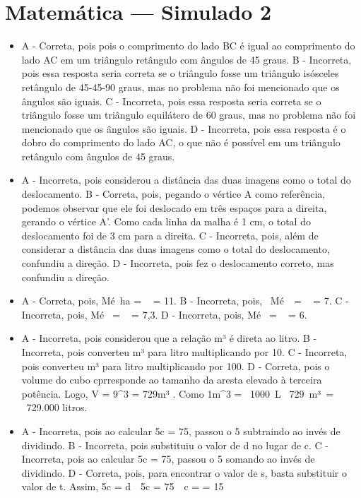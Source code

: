 \section*{Matemática — Simulado 2}
\begin{itemize}
\item A - Correta, pois pois o comprimento do lado BC é igual ao comprimento
do lado AC em um triângulo retângulo com ângulos de 45 graus.
B - Incorreta, pois essa resposta seria correta se o triângulo fosse um
triângulo isósceles retângulo de 45-45-90 graus, mas no problema não foi
mencionado que os ângulos são iguais.
C - Incorreta, pois essa resposta seria correta se o triângulo fosse um
triângulo equilátero de 60 graus, mas no problema não foi mencionado que
os ângulos são iguais.
D - Incorreta, pois essa resposta é o dobro do comprimento do lado AC, o
que não é possível em um triângulo retângulo com ângulos de 45 graus.
\item A - Incorreta, pois considerou a distância das duas imagens como o total
do deslocamento.
B - Correta, pois, pegando o vértice A como referência, podemos observar
que ele foi deslocado em três espaços para a direita, gerando o vértice
A'. Como cada linha da malha é 1 cm, o total do deslocamento foi de 3 cm
para a direita.
C - Incorreta, pois, além de considerar a distância das duas imagens
como o total do deslocamento, confundiu a direção.
D - Incorreta, pois fez o deslocamento correto, mas confundiu a direção.
\item A - Correta, pois,
Mé\ ha = \  = 11.
B - Incorreta, pois,
\ Mé\ \  = \  = 7.
C - Incorreta, pois,
Mé\  = \  = 7,3.
D - Incorreta, pois,
Mé\  = \  = 6.
\item A - Incorreta, pois considerou que a relação m³ é direta ao litro.
B - Incorreta, pois converteu m³ para litro multiplicando por 10.
C - Incorreta, pois converteu m³ para litro multiplicando por 100.
D - Correta, pois o volume do cubo cprresponde ao tamanho da aresta
elevado à terceira potência. Logo, V = 9^{3} = 729m³ . Como
1m^{3} = \ 1000\ L \rightarrow \ 729\ m³\  = \ 729.000 litros.
\item A - Incorreta, pois ao calcular 5c = 75, passou o 5 subtraindo ao
invés de dividindo.
B - Incorreta, pois substituiu o valor de d no lugar de c.
C - Incorreta, pois ao calcular 5c = 75, passou o 5 somando ao invés
de dividindo.
D - Correta, pois, para encontrar o valor de s, basta substituir o valor
de t. Assim, 5c = d\  \rightarrow \ 5c = 75\  \rightarrow \ c =  = 15
\end{itemize}

